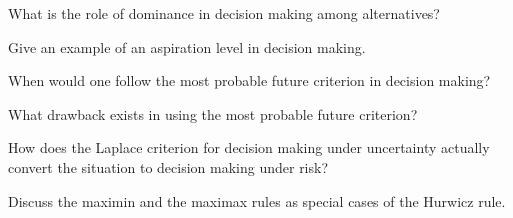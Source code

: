 \begin{exercises}
    \begin{exercise}
    \label{sea-7-29}
        What is the role of dominance in decision making among alternatives?
    \end{exercise}
    \begin{solution}
    \end{solution}
    
    \begin{exercise}
    \label{sea-7-30}
        Give an example of an aspiration level in decision making.
    \end{exercise}
    \begin{solution}
    \end{solution}
    
    \begin{exercise}
    \label{sea-7-31}
        When would one follow the most probable future criterion in decision making?
    \end{exercise}
    \begin{solution}
    \end{solution}
    
    \begin{exercise}
    \label{sea-7-32}
        What drawback exists in using the most probable future criterion?
    \end{exercise}
    \begin{solution}
    \end{solution}
    
    \begin{exercise}
    \label{sea-7-33}
        How does the Laplace criterion for decision making under uncertainty actually convert the situation to decision making under risk?
    \end{exercise}
    \begin{solution}
    \end{solution}
    
    \begin{exercise}
    \label{sea-7-34}
        Discuss the maximin and the maximax rules as special cases of the Hurwicz rule.
    \end{exercise}
    \begin{solution}
    \end{solution}
    

\end{exercises}

